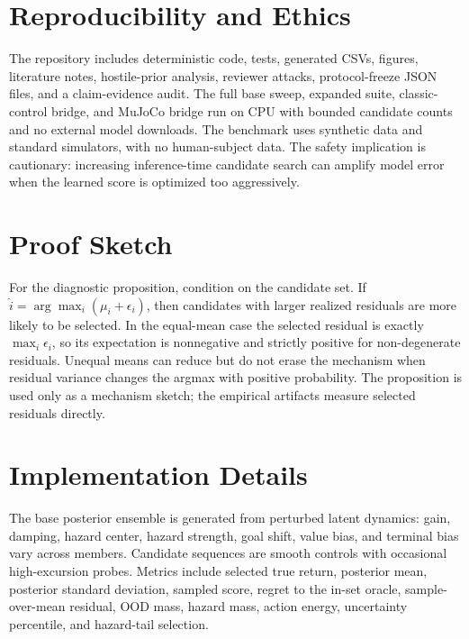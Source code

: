 \documentclass{article}
\begin{document}
\section{Reproducibility and Ethics}

The repository includes deterministic code, tests, generated CSVs, figures,
literature notes, hostile-prior analysis, reviewer attacks, protocol-freeze
JSON files, and a claim-evidence audit. The full base sweep, expanded suite,
classic-control bridge, and MuJoCo bridge run on CPU with bounded candidate
counts and no external model downloads. The benchmark uses synthetic data and
standard simulators, with no human-subject data. The safety implication is
cautionary: increasing inference-time candidate search can amplify model error
when the learned score is optimized too aggressively.




\appendix
\section{Proof Sketch}

For the diagnostic proposition, condition on the candidate set. If
$\hat{i}=\arg\max_i(\mu_i+\epsilon_i)$, then candidates with larger realized
residuals are more likely to be selected. In the equal-mean case the selected
residual is exactly $\max_i \epsilon_i$, so its expectation is nonnegative and
strictly positive for non-degenerate residuals. Unequal means can reduce but do
not erase the mechanism when residual variance changes the argmax with
positive probability. The proposition is used only as a mechanism sketch; the
empirical artifacts measure selected residuals directly.

\section{Implementation Details}

The base posterior ensemble is generated from perturbed latent dynamics:
gain, damping, hazard center, hazard strength, goal shift, value bias, and
terminal bias vary across members. Candidate sequences are smooth controls
with occasional high-excursion probes. Metrics include selected true return,
posterior mean, posterior standard deviation, sampled score, regret to the
in-set oracle, sample-over-mean residual, OOD mass, hazard mass, action energy,
uncertainty percentile, and hazard-tail selection.
\end{document}
